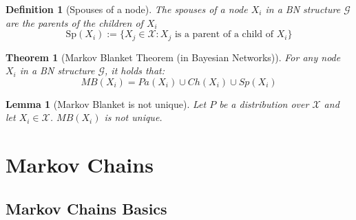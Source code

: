 \documentclass[11pt]{article}
\numberwithin{equation}{section}
\theoremstyle{boldStyle}
\theoremstyle{boldBlueStyle}
\newtheorem{lemma}{Lemma}[section]
\theoremstyle{boldPurpleStyle}
\newtheorem{theorem}{Theorem}[section]
\theoremstyle{boldRedStyle}
\newtheorem{definition}{Definition}[section]
\begin{document}
\begin{definition}[Spouses of a node]
    The spouses of a node $X_i$ in a BN structure $\mathcal{G}$ are the parents of the children of $X_i$
    \begin{equation*}
        \text{Sp}(X_i) := \{ X_j \in \mathcal{X} : X_j \text{ is a parent of a child of } X_i \}
    \end{equation*}
\end{definition}

\begin{theorem}[Markov Blanket Theorem (in Bayesian Networks)]
    For any node $X_i$ in a BN structure $\mathcal{G}$, it holds that:
    \begin{equation*}
        MB(X_i) = Pa(X_i) \cup Ch(X_i) \cup Sp(X_i)
    \end{equation*}
\end{theorem}

\begin{lemma}[Markov Blanket is not unique]
    Let $P$ be a distribution over $\mathcal{X}$ and let $X_i \in \mathcal{X}$. $MB(X_i)$ is not unique.
\end{lemma}




\newpage
\section{Markov Chains}

\subsection{Markov Chains Basics}
\end{document}
